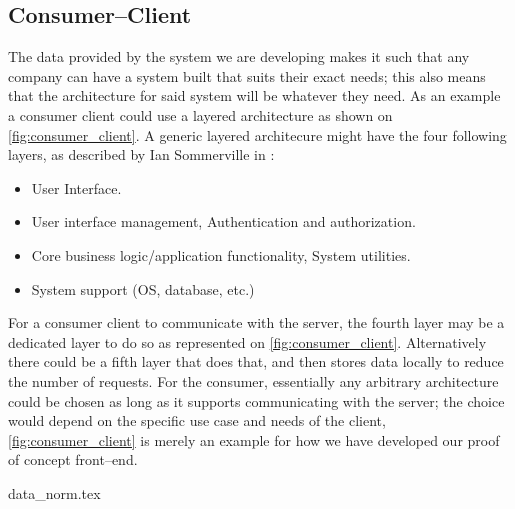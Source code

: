 \subsection{Consumer--Client}
The data provided by the system we are developing makes it such that any company can have a system built that suits their exact needs; this also means that the architecture for said system will be whatever they need.
As an example a consumer client could use a layered architecture as shown on \cref{fig:consumer_client}.
A generic layered architecure might have the four following layers, as described by Ian Sommerville in \cite{software_engineering}:
\begin{itemize}
    \item User Interface.
    \item User interface management, Authentication and authorization.
    \item Core business logic/application functionality, System utilities.
    \item System support (OS, database, etc.)
\end{itemize}
For a consumer client to communicate with the server, the fourth layer may be a dedicated layer to do so as represented on \cref{fig:consumer_client}.
Alternatively there could be a fifth layer that does that, and then stores data locally to reduce the number of requests.
For the consumer, essentially any arbitrary architecture could be chosen as long as it supports communicating with the server; the choice would depend on the specific use case and needs of the client, \cref{fig:consumer_client} is merely an example for how we have developed our proof of concept front--end.

{data_norm.tex}

